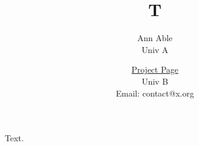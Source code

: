 \documentclass{article}
\title{T}
\author{Ann Able \\ Univ A \and \href{https://x.org/p}{Project Page} \\ Univ B \\ Email: contact@x.org}
\begin{document}
\maketitle
Text.
\end{document}
